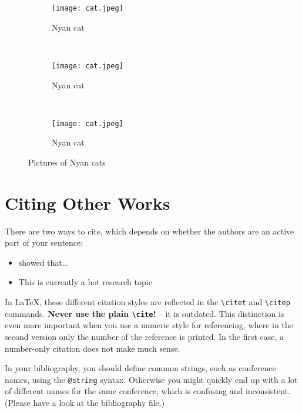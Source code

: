 \documentclass[{{cookiecutter.project_slug}}.tex]{subfiles}
\begin{document}
    \begin{figure}
        \centering
        \begin{subfigure}[b]{0.3\textwidth}
            \texttt{[image: cat.jpeg]}
            \caption{Nyan cat}
            \label{fig:cat1}
        \end{subfigure}%
        ~ %
        \begin{subfigure}[b]{0.3\textwidth}
            \texttt{[image: cat.jpeg]}
            \caption{Nyan cat}
            \label{fig:cat2} 
        \end{subfigure}
        ~ %
        \begin{subfigure}[b]{0.3\textwidth}
            \texttt{[image: cat.jpeg]}
            \caption{Nyan cat}
            \label{fig:cat3}  
        \end{subfigure}
        \caption[Nyan cats]{Pictures of Nyan cats}\label{fig:cats}
    \end{figure}



    \section{Citing Other Works}
    There are two ways to cite, which depends on whether the authors are an
    active part of your sentence:
    \begin{itemize}[noitemsep]
        \item \citet{muster} showed that\ldots{}
        \item This is currently a hot research topic \citep{muster}
    \end{itemize}
    In  \LaTeX{}, these  different  citation styles  are  reflected in  the
    \texttt{\textbackslash citet}  and  \texttt{\textbackslash citep}  commands. \textbf{Never  use  the  plain
    \texttt{\textbackslash cite}!} -- it is outdated.
    This distinction  is even more important  when you use a  numeric style
    for referencing, where in the second version only the number of the 
    reference is printed.   In the first case, a  number-only citation does
    not make much sense.

    In  your  bibliography, you  should  define  common strings,  such  as 
    conference  names, using  the  \verb|@string|  syntax.  Otherwise  you 
    might  quickly end  up with  a  lot of  different names  for the  same 
    conference, which is confusing and  inconsistent.  (Please have a look 
    at the bibliography file.)                                             
\end{document}
